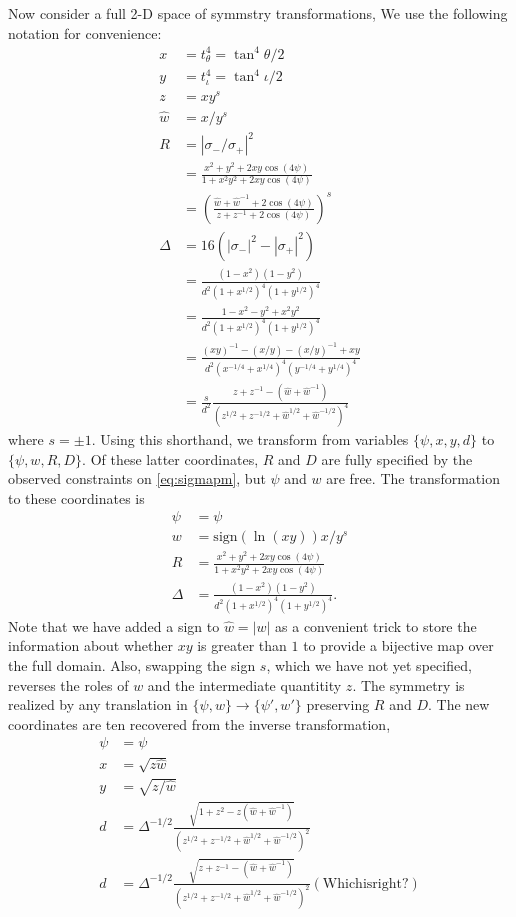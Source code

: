 \documentclass[aps,showpacs,12pt,onecolumn,prd,superscriptaddress,nofootinbib]{revtex4}
\newcommand\C{{\cos(4\psi)}}
\begin{document}
Now consider a full 2-D space of symmstry transformations,
We use the following notation for convenience:
\begin{align}
  x&=t^4_{\theta}=\tan^4{\theta/2}\\
  y&=t^4_{\iota}=\tan^4{\iota/2}\\
  z&=xy^s\\
  \hat w&=x/y^s\\
  R&=|\sigma_-/\sigma_+|^2\\
  &=\frac{x^2+y^2+2xy\C}{1+x^2y^2+2xy\C}\\
  &=\left(\frac{\hat w+\hat w^{-1}+2\C}{z+z^{-1}+2\C}\right)^s\\
  \Delta&=16(|\sigma_-|^2-|\sigma_+|^2)\\
  &=\frac{(1-x^2)(1-y^2)}{d^2(1+x^{1/2})^4(1+y^{1/2})^4}\\
  &=\frac{1-x^2-y^2+x^2y^2}{d^2(1+x^{1/2})^4(1+y^{1/2})^4}\\
  &=\frac{(xy)^{-1}-(x/y)-(x/y)^{-1}+xy}{d^2(x^{-1/4}+x^{1/4})^4(y^{-1/4}+y^{1/4})^4}\\
  &=\frac{s}{d^2}\frac{z+z^{-1}-(\hat w+{\hat w}^{-1})}{(z^{1/2}+z^{-1/2}+{\hat w}^{1/2}+{\hat w}^{-1/2})^4}
\end{align}
where $s=\pm1$.
Using this shorthand, we transform from variables $\{\psi,x,y,d\}$ to $\{\psi,w,R,D\}$.
Of these latter coordinates, $R$ and $D$ are fully specified by the observed constraints on \eqref{eq:sigmapm},
but $\psi$ and $w$ are free. The transformation to these coordinates is
\begin{align}
  \psi&=\psi\\
  w&=\mathrm{sign}(\ln(xy))x/y^s\\
  R&=\frac{x^2+y^2+2xy\C}{1+x^2y^2+2xy\C}\\
  \Delta&=\frac{(1-x^2)(1-y^2)}{d^2(1+x^{1/2})^4(1+y^{1/2})^4}.
\end{align}
Note that we have added a sign to ${\hat w}=|w|$ as a convenient trick to
store the information about whether $xy$ is greater than $1$ to provide a bijective map over the full domain. 
Also, swapping the sign $s$, which we have not yet specified, reverses the roles of $w$ and the intermediate quantitity $z$.
The symmetry is realized by any translation in $\{\psi,w\}\rightarrow\{\psi',w'\}$ preserving $R$ and $D$.
The new coordinates are ten recovered from the inverse transformation, 
\begin{align}
  \psi&=\psi\\
  x&=\sqrt{z\hat w}\\
  y&=\sqrt{z/{\hat w}}\\
  d&={\Delta^{-1/2}}\frac {\sqrt{1+z^2-z(\hat w+{\hat w}^{-1})}}{(z^{1/2}+z^{-1/2}+{\hat w}^{1/2}+{\hat w}^{-1/2})^2}\\
  d&={\Delta^{-1/2}}\frac {\sqrt{z+z^{-1}-(\hat w+{\hat w}^{-1})}}{(z^{1/2}+z^{-1/2}+{\hat w}^{1/2}+{\hat w}^{-1/2})^2} \mathrm{(Which is right?)}
\end{align}
\end{document}
